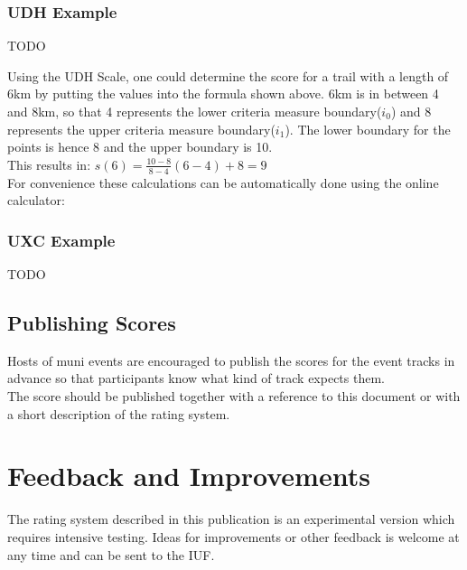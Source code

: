 \documentclass[a4paper,oneside]{scrartcl}
\begin{document}
\subsubsection{UDH Example}
TODO%

Using the UDH Scale, one could determine the score for a trail with a length of
6km by putting the values into the formula shown above. 6km is in between 4 and
8km, so that 4 represents the lower criteria measure boundary($i_0$) and 8
represents the upper criteria measure boundary($i_1$). The lower boundary for
the points is hence 8 and the upper boundary is 10.\\
This results in: $s(6) = \frac{10 - 8}{8 - 4} (6 - 4) + 8 = 9$\\

For convenience these calculations can be automatically done using the
online calculator: %

\subsubsection{UXC Example}
TODO



\subsection{Publishing Scores}
Hosts of muni events are encouraged to publish the scores for the event tracks
in advance so that participants know what kind of track expects them.\\ The
score should be published together with a reference to this document or with a
short description of the rating system.

\section{Feedback and Improvements}
The rating system described in this publication is an experimental version which
requires intensive testing. Ideas for improvements or other feedback is welcome
at any time and can be sent to the IUF. %
\end{document}
